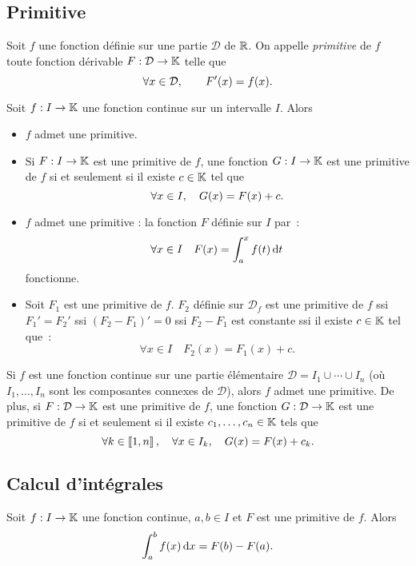 \documentclass{magnolia}
\begin{document}
\subsection{Primitive}
\begin{definition}[utile=-3]
Soit $f$ une fonction définie sur une partie $\mathcal{D}$ de $\mathbb{R}$. On
appelle \emph{primitive} de $f$ toute fonction dérivable $F:\mathcal{D}\to\mathbb{K}$ telle que
\[\forall x\in\mathcal{D},\quad \quad F'(x)=f(x).\]
\end{definition}

\begin{proposition}[utile=-3]
Soit $f:I\to\mathbb{K}$ une fonction continue sur un intervalle $I$. Alors
\begin{itemize}
\item $f$ admet une primitive.
\item Si $F:I\to\mathbb{K}$ est une primitive de $f$, une fonction $G:I\to\mathbb{K}$  est une primitive de $f$ si et seulement si il existe
  $c\in\mathbb{K}$ tel que
  \[\forall x\in I ,\quad G(x)=F(x)+c.\]
\end{itemize}
\end{proposition}

\begin{preuve}
\begin{itemize}
\item $f$ admet une primitive : la fonction $F$ définie sur $I$ par~:
\[\forall x\in I \quad F(x)=\int_{a}^{x} f(t)\,\text{d}t\] fonctionne.
\item Soit $F_1$ est une primitive de $f$. $F_2$ définie sur
  $\mathcal{D}_f$ est une primitive de $f$ ssi $F_1'=F_2'$ ssi $(F_2-F_1)'=0$ ssi $F_2-F_1$ est constante ssi il existe
  $c\in\mathbb{K}$ tel que~:
  \[\forall x\in I \quad F_2(x)=F_1(x)+c.\]
\end{itemize}
\end{preuve}

\begin{remarqueUnique}
\remarque Si $f$ est une fonction continue sur une partie élémentaire
$\mathcal{D}= I_1\cup\cdots\cup I_n$ (où $I_1,\ldots,I_n$ sont les composantes
connexes de $\mathcal{D}$), alors $f$ admet une primitive. De plus, si $F:\mathcal{D}\to\mathbb{K}$ est
une primitive de $f$, une fonction $G:\mathcal{D}\to\mathbb{K}$ est une primitive de $f$
si et seulement si il existe $c_1,\ldots,c_n \in\mathbb{K}$ tels que
\[\forall k\in\left\llbracket 1,n\right\rrbracket ,\quad \forall x\in I_k ,\quad
 G(x)=F(x)+c_k.\]
\end{remarqueUnique}

\subsection{Calcul d'intégrales}
\begin{theoreme}[nom={Théorème fondamental de l'analyse}]
Soit $f:I\to\mathbb{K}$ une fonction continue, $a,b\in I$ et $F$ est
une primitive de $f$. Alors
\[\int_{a}^{b} f(x)\,\text{d}x=F(b)-F(a).\]
\end{theoreme}
\end{document}
